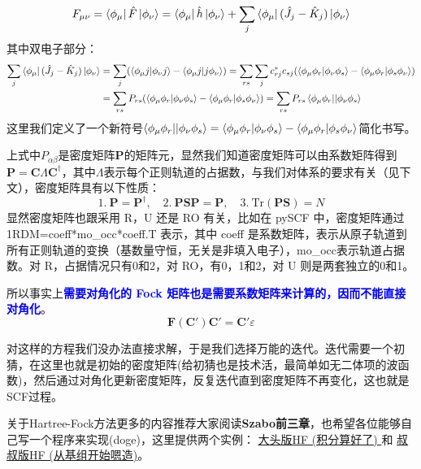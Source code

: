 \[F_{\mu\nu}=\bra{\phi_{\mu}}\hat{F}\ket{\phi_{\nu}}=\bra{\phi_{\mu}}\hat{h}\ket{\phi_{\nu}}+\sum_j\bra{\phi_{\mu}}(\hat{J}_j-\hat{K}_j)\ket{\phi_{\nu}}\]
其中双电子部分：
\begin{equation*}
\begin{aligned}
\sum_j\bra{\phi_{\mu}}(\hat{J}_j-\hat{K}_j)\ket{\phi_{\nu}}&=\sum_{j}(\bra{\phi_{\mu}j}\ket{\phi_{\nu}j}-\bra{\phi_{\mu}j}\ket{j\phi_{\nu}})=\sum_{rs}\sum_{j}c_{rj}^*c_{sj}(\bra{\phi_{\mu}\phi_r}\ket{\phi_{\nu}\phi_s}-\bra{\phi_{\mu}\phi_r}\ket{\phi_s\phi_{\nu}})\\
&=\sum_{rs}P_{rs}(\bra{\phi_{\mu}\phi_r}\ket{\phi_{\nu}\phi_s}-\bra{\phi_{\mu}\phi_r}\ket{\phi_s\phi_{\nu}})=\sum_{rs}P_{rs}\bra{\phi_{\mu}\phi_r}\ket{|\phi_{\nu}\phi_s}\\
\end{aligned}
\end{equation*}
这里我们定义了一个新符号$\bra{\phi_{\mu}\phi_r}\ket{|\phi_{\nu}\phi_s}=\bra{\phi_{\mu}\phi_r}\ket{\phi_{\nu}\phi_s}-\bra{\phi_{\mu}\phi_r}\ket{\phi_s\phi_{\nu}}$简化书写。

上式中$P_{\alpha\beta}$是密度矩阵$\mathbf{P}$的矩阵元，显然我们知道密度矩阵可以由系数矩阵得到$\mathbf{P}=\mathbf{C}\Lambda\mathbf{C}^{\dagger}$，其中$\Lambda$表示每个正则轨道的占据数，与我们对体系的要求有关（见下文），密度矩阵具有以下性质：
\[1. \ \mathbf{P}=\mathbf{P}^{\dagger}, \quad 2. \ \mathbf{P}\mathbf{S}\mathbf{P}=\mathbf{P}, \quad 3.\ \text{Tr}(\mathbf{P}\mathbf{S})=N\]
显然密度矩阵也跟采用 R，U 还是 RO 有关，比如在 pySCF 中，密度矩阵通过 1RDM=coeff*mo\_occ*coeff.T 表示，其中 coeff 是系数矩阵，表示从原子轨道到所有正则轨道的变换（基数量守恒，无关是非填入电子），mo\_occ表示轨道占据数。对 R，占据情况只有0和2，对 RO，有0，1和2，对 U 则是两套独立的0和1。

所以事实上\textcolor{blue}{\textbf{需要对角化的 Fock 矩阵也是需要系数矩阵来计算的，因而不能直接对角化}}。
\[\mathbf{F}(\mathbf{C}')\mathbf{C}'=\mathbf{C}'\varepsilon\]

对这样的方程我们没办法直接求解，于是我们选择万能的迭代。迭代需要一个初猜，在这里也就是初始的密度矩阵(给初猜也是技术活，最简单如无二体项的波函数)，然后通过对角化更新密度矩阵，反复迭代直到密度矩阵不再变化，这也就是SCF过程。

关于Hartree-Fock方法更多的内容推荐大家阅读\textbf{Szabo前三章}，也希望各位能够自己写一个程序来实现(doge)，这里提供两个实例：
\href{https://github.com/yangdatou/hf-tutorial}{大头版HF (积分算好了) }和
\href{https://github.com/Walter-Feng/Hartree-Fock-in-CPP}{叔叔版HF (从基组开始嗯造)}。

